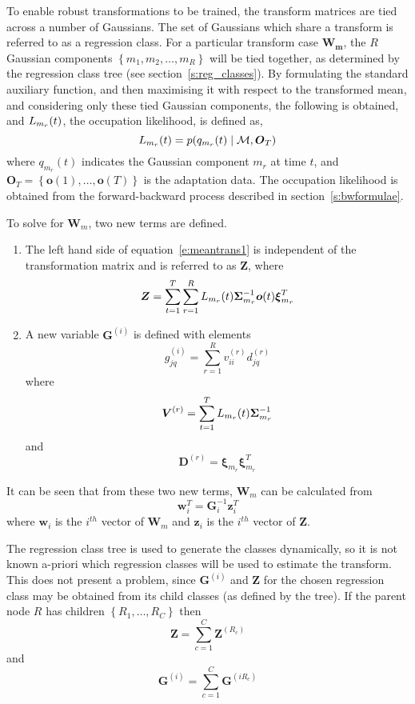 To enable robust transformations to be trained, the transform matrices
are tied across a number of Gaussians. The set of Gaussians which
share a transform is referred to as a regression class.
For a particular transform case $\bm{W_m}$, the $R$ Gaussian
components $\left\{m_1, m_2, \dots, m_R\right\}$ will be tied
together, as determined by the regression class tree (see
section~\ref{s:reg_classes}).
By formulating the standard auxiliary function, and then maximising it
with respect to the transformed mean, and considering only these tied
Gaussian components, the following is obtained,
and $L_{m_r}(t)$, the occupation likelihood, is defined as,
\[ 
         L_{m_r}(t) = p(q_{m_r}(t)\;|\;\mathcal{M}, {\mbox{\boldmath $O$}}_T)
\]
where $q_{m_r}(t)$ indicates the Gaussian component $m_r$ at time $t$,
and $\bm{O}_T = \left\{\bm{o}(1),\dots,\bm{o}(T)\right\}$ is the
adaptation data. The occupation likelihood is obtained from the
forward-backward process described in section~\ref{s:bwformulae}.

To solve for $\bm{W}_m$, two new terms are defined.
\begin{enumerate}
\item
The left hand side of equation~\ref{e:meantrans1} is independent of
the transformation matrix and is referred to as $\bm{Z}$, where
\[
        {\mbox{\boldmath $Z$}} = \sum_{t=1}^{T} 
        \sum_{r=1}^{R}
        L_{m_r}(t){\mbox{\boldmath $\Sigma$}}_{m_r}^{-1}{\mbox{\boldmath $o$}}(t){\mbox{\boldmath $\xi$}}_{m_r}^T
\]
\item
A new variable $\bm{G}^{(i)}$ is defined with elements
\[ 
        g_{jq}^{(i)} = \sum_{r=1}^{R} v_{ii}^{(r)} d_{jq}^{(r)}
\]
where
\[
        {\mbox{\boldmath $V$}}^{(r)} = \sum_{t=1}^{T} L_{m_r}(t) {\mbox{\boldmath $\Sigma$}}_{m_r}^{-1}
\]      
and
\[
        \bm{D}^{(r)} = \bm{\xi}_{m_r}\bm{\xi}_{m_r}^T 
\]
\end{enumerate}
 
It can be seen that from these two new terms, $\bm{W}_m$ can be
calculated from
\[
        \bm{w}_i^T = \bm{G}_i^{-1} \bm{z}_i^T
\]
where $\bm{w}_i$ is the $i^{th}$ vector of $\bm{W}_m$ and $\bm{z}_i$
is the $i^{th}$ vector of $\bm{Z}$.

The regression class tree is used to generate the classes dynamically,
so it is not known a-priori which regression classes will be used to
estimate the transform. This does not present a problem, since
$\bm{G}^{(i)}$ and $\bm{Z}$ for the chosen regression class may be
obtained from its child classes (as defined by the tree). If the
parent node $R$ has children $\left\{R_1,\dots,R_C\right\}$ then
\[
        \bm{Z} = \sum_{c=1}^{C} \bm{Z}^{(R_c)}
\]
and
\[
        \bm{G}^{(i)} = \sum_{c=1}^{C} \bm{G}^{(iR_c)}
\]

